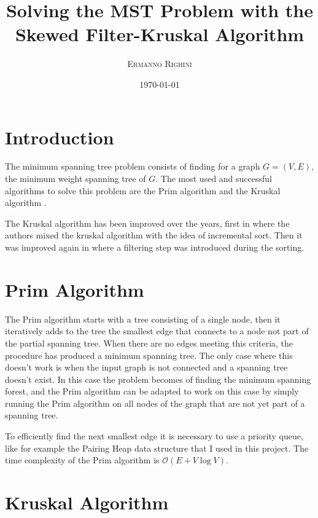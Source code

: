 \documentclass{article}
\title{Solving the MST Problem with the Skewed Filter-Kruskal Algorithm} %
\author{%
\textsc{Ermanno Righini}%
\\[1ex] %
}
\date{\today} %
\begin{document}
\maketitle


\section{Introduction}

The minimum spanning tree problem consists of finding for a graph $G=(V,E)$, the minimum weight spanning tree of $G$.
The most used and successful algorithms to solve this problem are the Prim algorithm \cite{prim} and the Kruskal algorithm \cite{kruskal}.

The Kruskal algorithm has been improved over the years, first in \cite{incremental} where the authors mixed the kruskal algorithm with the idea of incremental sort. Then it was improved again in \cite{filterkruskal} where a filtering step was introduced during the sorting.

\section{Prim Algorithm}

The Prim algorithm starts with a tree consisting of a single node, then it iteratively adds to the tree the smallest edge that connects to a node not part of the partial spanning tree. When there are no edges meeting this criteria, the procedure has produced a minimum spanning tree. The only case where this doesn't work is when the input graph is not connected and a spanning tree doesn't exist. In this case the problem becomes of finding the minimum spanning forest, and the Prim algorithm can be adapted to work on this case by simply running the Prim algorithm on all nodes of the graph that are not yet part of a spanning tree.

To efficiently find the next smallest edge it is necessary to use a priority queue, like for example the Pairing Heap data structure \cite{pairing} that I used in this project.
The time complexity of the Prim algorithm is $\mathcal{O}(E + V\log V)$.

\section{Kruskal Algorithm}
\end{document}
